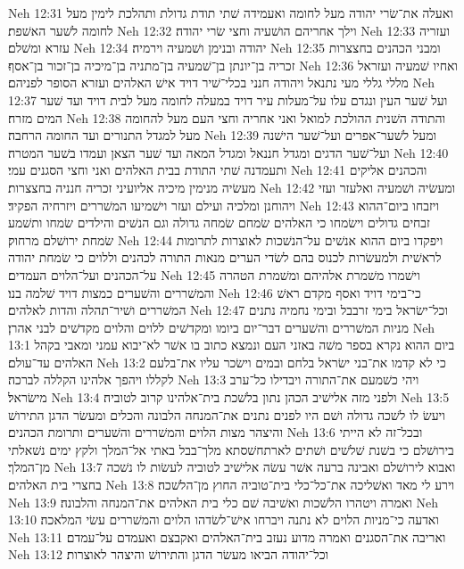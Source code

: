 Neh 12:31  ואעלה את־שׂרי יהודה מעל לחומה ואעמידה שׁתי תודת גדולת ותהלכת לימין מעל לחומה לשׁער האשׁפת׃
Neh 12:32  וילך אחריהם הושׁעיה וחצי שׂרי יהודה׃
Neh 12:33  ועזריה עזרא ומשׁלם׃
Neh 12:34  יהודה ובנימן ושׁמעיה וירמיה׃
Neh 12:35  ומבני הכהנים בחצצרות זכריה בן־יונתן בן־שׁמעיה בן־מתניה בן־מיכיה בן־זכור בן־אסף׃
Neh 12:36  ואחיו שׁמעיה ועזראל מללי גללי מעי נתנאל ויהודה חנני בכלי־שׁיר דויד אישׁ האלהים ועזרא הסופר לפניהם׃
Neh 12:37  ועל שׁער העין ונגדם עלו על־מעלות עיר דויד במעלה לחומה מעל לבית דויד ועד שׁער המים מזרח׃
Neh 12:38  והתודה השׁנית ההולכת למואל ואני אחריה וחצי העם מעל להחומה מעל למגדל התנורים ועד החומה הרחבה׃
Neh 12:39  ומעל לשׁער־אפרים ועל־שׁער הישׁנה ועל־שׁער הדגים ומגדל חננאל ומגדל המאה ועד שׁער הצאן ועמדו בשׁער המטרה׃
Neh 12:40  ותעמדנה שׁתי התודת בבית האלהים ואני וחצי הסגנים עמי׃
Neh 12:41  והכהנים אליקים מעשׂיה מנימין מיכיה אליועיני זכריה חנניה בחצצרות׃
Neh 12:42  ומעשׂיה ושׁמעיה ואלעזר ועזי ויהוחנן ומלכיה ועילם ועזר וישׁמיעו המשׁררים ויזרחיה הפקיד׃
Neh 12:43  ויזבחו ביום־ההוא זבחים גדולים וישׂמחו כי האלהים שׂמחם שׂמחה גדולה וגם הנשׁים והילדים שׂמחו ותשׁמע שׂמחת ירושׁלם מרחוק׃
Neh 12:44  ויפקדו ביום ההוא אנשׁים על־הנשׁכות לאוצרות לתרומות לראשׁית ולמעשׂרות לכנוס בהם לשׂדי הערים מנאות התורה לכהנים וללוים כי שׂמחת יהודה על־הכהנים ועל־הלוים העמדים׃
Neh 12:45  וישׁמרו משׁמרת אלהיהם ומשׁמרת הטהרה והמשׁררים והשׁערים כמצות דויד שׁלמה בנו׃
Neh 12:46  כי־בימי דויד ואסף מקדם ראשׁ המשׁררים ושׁיר־תהלה והדות לאלהים׃
Neh 12:47  וכל־ישׂראל בימי זרבבל ובימי נחמיה נתנים מניות המשׁררים והשׁערים דבר־יום ביומו ומקדשׁים ללוים והלוים מקדשׁים לבני אהרן׃
Neh 13:1  ביום ההוא נקרא בספר משׁה באזני העם ונמצא כתוב בו אשׁר לא־יבוא עמני ומאבי בקהל האלהים עד־עולם׃
Neh 13:2  כי לא קדמו את־בני ישׂראל בלחם ובמים וישׂכר עליו את־בלעם לקללו ויהפך אלהינו הקללה לברכה׃
Neh 13:3  ויהי כשׁמעם את־התורה ויבדילו כל־ערב מישׂראל׃
Neh 13:4  ולפני מזה אלישׁיב הכהן נתון בלשׁכת בית־אלהינו קרוב לטוביה׃
Neh 13:5  ויעשׂ לו לשׁכה גדולה ושׁם היו לפנים נתנים את־המנחה הלבונה והכלים ומעשׂר הדגן התירושׁ והיצהר מצות הלוים והמשׁררים והשׁערים ותרומת הכהנים׃
Neh 13:6  ובכל־זה לא הייתי בירושׁלם כי בשׁנת שׁלשׁים ושׁתים לארתחשׁסתא מלך־בבל באתי אל־המלך ולקץ ימים נשׁאלתי מן־המלך׃
Neh 13:7  ואבוא לירושׁלם ואבינה ברעה אשׁר עשׂה אלישׁיב לטוביה לעשׂות לו נשׁכה בחצרי בית האלהים׃
Neh 13:8  וירע לי מאד ואשׁליכה את־כל־כלי בית־טוביה החוץ מן־הלשׁכה׃
Neh 13:9  ואמרה ויטהרו הלשׁכות ואשׁיבה שׁם כלי בית האלהים את־המנחה והלבונה׃
Neh 13:10  ואדעה כי־מניות הלוים לא נתנה ויברחו אישׁ־לשׂדהו הלוים והמשׁררים עשׂי המלאכה׃
Neh 13:11  ואריבה את־הסגנים ואמרה מדוע נעזב בית־האלהים ואקבצם ואעמדם על־עמדם׃
Neh 13:12  וכל־יהודה הביאו מעשׂר הדגן והתירושׁ והיצהר לאוצרות׃
